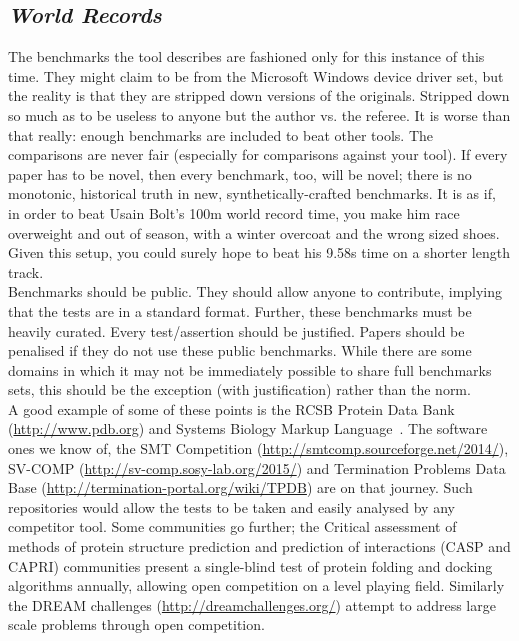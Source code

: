 \documentclass[a4paper,11pt]{article}
\begin{document}
\subsection{{\emph{World Records}}}

The benchmarks the tool describes are fashioned only for this instance
of this time. They might claim to be from the Microsoft Windows device
driver set, but the reality is that they are stripped down versions of
the originals. Stripped down so much as to be useless to anyone but
the author vs. the referee. It is worse than that really: enough
benchmarks are included to beat other tools. The comparisons are never
fair (especially for comparisons against your tool). If every paper
has to be novel, then every benchmark, too, will be novel; there is no
monotonic, historical truth in new, synthetically-crafted
benchmarks. It is as if, in order to beat Usain Bolt's
\num{100}\si{\metre} world record time, you make him race overweight
and out of season, with a winter overcoat and the wrong sized
shoes. Given this setup, you could surely hope to beat his
\num{9.58}\si{\second} time on a shorter length track.\\

 Benchmarks should
be public. They should allow anyone to contribute, implying that the
tests are in a standard format. Further, these benchmarks must be
heavily curated. Every test/assertion should be justified. Papers
should be penalised if they do not use these public benchmarks. While
there are some domains in which it may not be immediately possible to
share full benchmarks sets, this should be the exception (with
justification) rather than the norm.\\

A good example of some of these points is the RCSB Protein Data
Bank (\url{http://www.pdb.org}) and Systems Biology Markup
Language~\cite{Chaouiya2013}. The software ones we know of,
the SMT
Competition (\url{http://smtcomp.sourceforge.net/2014/}),
SV-COMP (\url{http://sv-comp.sosy-lab.org/2015/}) and
Termination Problems Data
Base (\url{http://termination-portal.org/wiki/TPDB}) are on
that journey. Such repositories would allow the tests to be taken and
easily analysed by any competitor tool. Some communities go further;
the Critical assessment of methods of protein structure prediction
and prediction of interactions (CASP and CAPRI)\cite{Moult2015,Lensink2017} communities present 
a single-blind test of protein folding and docking
algorithms annually, allowing open competition on a level playing 
field. Similarly the DREAM challenges (\url{http://dreamchallenges.org/}) 
attempt to address large scale problems through open competition.
\end{document}
